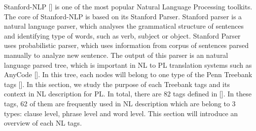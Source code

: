 Stanford-NLP [\cite{P13-1045}] is one of the most popular Natural Language Processing toolkits. The core of Stanford-NLP is based on its Stanford Parser. Stanford parser is a natural language parser, which analyses the grammatical structure of sentences and identifying type of words, such as verb, subject or object. Stanford Parser uses probabilistic parser, which uses information from corpus of sentences parsed manually to analyze new sentence. The output of this parser is an natural language parsed tree, which is important in NL to PL translation systems such as AnyCode [\cite{Gvero:2015:SJE:2814270.2814295}]. In this tree, each nodes will belong to one type of the Penn Treebank tags [\cite{Taylor2003}]. In this section, we study the purpose of each Treebank tags and its context in NL description for PL. In total, there are 82 tags defined in [\cite{Taylor2003}]. In these tags, 62 of them are frequently used in  NL description which are belong to 3 types: clause level, phrase level and word level. This section will introduce an overview of each NL tags.

